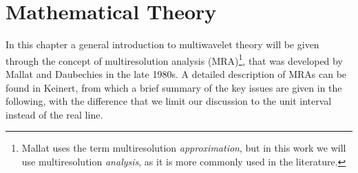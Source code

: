\chapter{Mathematical Theory}\label{chap:mathematics}
In this chapter a general introduction to multiwavelet theory will be given through 
the concept of multiresolution analysis (MRA)\footnote{Mallat uses the term 
multiresolution \emph{approximation}, but in this work we will use multiresolution 
\emph{analysis}, as it is more commonly used in the literature.}, that was developed 
by Mallat\cite{Mallat:1989} and Daubechies\cite{Daubechies:1988} in the late 1980s. 
A detailed description of MRAs can be found in Keinert\cite{Keinert:2004}, from 
which a brief summary of the key issues are given in the following, with the 
difference that we limit our discussion to the unit interval instead of the real line.

